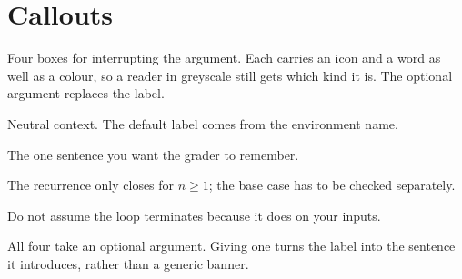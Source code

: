 \section{Callouts}

Four boxes for interrupting the argument.
Each carries an icon and a word as well as a colour, so a reader in greyscale still gets which kind it is.
The optional argument replaces the label.

\begin{callout}
  Neutral context.
  The default label comes from the environment name.
\end{callout}

\begin{tip}
  The one sentence you want the grader to remember.
\end{tip}

\begin{warn}
  The recurrence only closes for $n\geq 1$; the base case has to be checked separately.
\end{warn}

\begin{caution}
  Do not assume the loop terminates because it does on your inputs.
\end{caution}

\begin{callout}
  All four take an optional argument.
  Giving one turns the label into the sentence it introduces, rather than a generic banner.
\end{callout}
